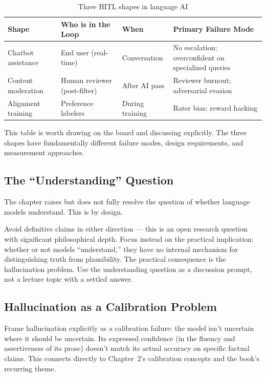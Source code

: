 \begin{table}[htbp]
\caption{Three HITL shapes in language AI}
\label{tab:three-hitl-shapes}
\centering
\begin{tabular}{@{}p{3cm}p{3cm}p{2.5cm}p{3cm}@{}}
\toprule
\textbf{Shape} & \textbf{Who is in the Loop} & \textbf{When} & \textbf{Primary Failure Mode} \\
\midrule
Chatbot assistance & End user (real-time) & Conversation & No escalation; overconfident on specialized queries \\
Content moderation & Human reviewer (post-filter) & After AI pass & Reviewer burnout; adversarial evasion \\
Alignment training & Preference labelers & During training & Rater bias; reward hacking \\
\bottomrule
\end{tabular}
\end{table}

This table is worth drawing on the board and discussing explicitly. The three shapes have fundamentally different failure modes, design requirements, and measurement approaches.

\subsection{The ``Understanding'' Question}

The chapter raises but does not fully resolve the question of whether language models understand. This is by design.

\begin{keyconcept}
Avoid definitive claims in either direction --- this is an open research question with significant philosophical depth. Focus instead on the practical implication: whether or not models ``understand,'' they have no internal mechanism for distinguishing truth from plausibility. The practical consequence is the hallucination problem. Use the understanding question as a discussion prompt, not a lecture topic with a settled answer.
\end{keyconcept}

\subsection{Hallucination as a Calibration Problem}

Frame hallucination explicitly as a calibration failure: the model isn't uncertain where it should be uncertain. Its expressed confidence (in the fluency and assertiveness of its prose) doesn't match its actual accuracy on specific factual claims. This connects directly to Chapter~2's calibration concepts and the book's recurring theme.


